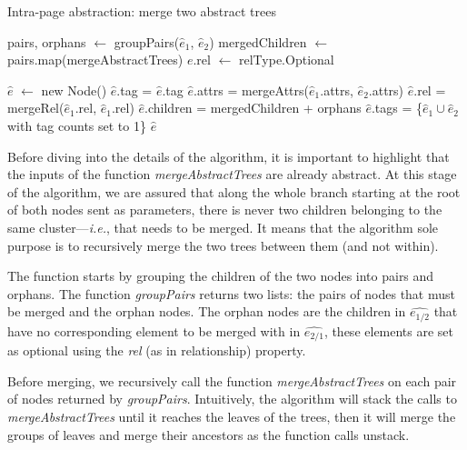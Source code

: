 \begin{algorithm}
\caption{Intra-page abstraction: merge two abstract trees}\label{alg:mergeAbstractTrees}
\begin{algorithmic}[1]
    \State {}
    \State pairs, orphans $\gets$ groupPairs($\hat{e}_1$, $\hat{e}_2$)
    \State mergedChildren $\gets$ pairs.map(mergeAbstractTrees)
        \State $e$.rel $\gets$ relType.Optional
    \EndFor
    
    \State $\hat{e}$ $\gets$ new Node()
    \State $\hat{e}$.tag = $\hat{e}$.tag
    \State $\hat{e}$.attrs = mergeAttrs($\hat{e}_1$.attrs, $\hat{e}_2$.attrs)
    \State $\hat{e}$.rel = mergeRel($\hat{e}_1$.rel, $\hat{e}_1$.rel)
    \State $\hat{e}$.children = mergedChildren + orphans
    \State $\hat{e}$.tags = \{$\hat{e}_1 \cup \hat{e}_2$ with tag counts set to 1\}
    \State \Return $\hat{e}$
  \EndFunction
\end{algorithmic}
\end{algorithm}

Before diving into the details of the algorithm, it is important to highlight that the inputs of the function \emph{mergeAbstractTrees} are already abstract.
At this stage of the algorithm, we are assured that along the whole branch starting at the root of both nodes sent as parameters, there is never two children belonging to the same cluster---\emph{i.e.}, that needs to be merged.
It means that the algorithm sole purpose is to recursively merge the two trees between them (and not within).

The function starts by grouping the children of the two nodes into pairs and orphans.
The function \emph{groupPairs} returns two lists: the pairs of nodes that must be merged and the orphan nodes. 
The orphan nodes are the children in $\hat{e_{1/2}}$ that have no corresponding element to be merged with in $\hat{e_{2/1}}$, these elements are set as optional using the \emph{rel} (as in relationship) property.

Before merging, we recursively call the function \emph{mergeAbstractTrees} on each pair of nodes returned by \emph{groupPairs}.
Intuitively, the algorithm will stack the calls to \emph{mergeAbstractTrees} until it reaches the leaves of
the trees, then it will merge the groups of leaves and merge their ancestors as the function calls unstack.

